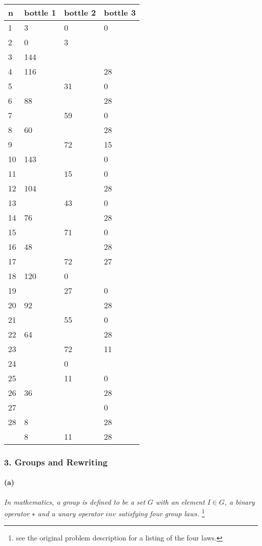 \documentclass[12pt]{article}
\begin{document}
\begin{tabular}{|l|l|l|l|}
    \hline  
    n & bottle 1    & bottle 2  & bottle 3  \\  
    \hline \hline
    1 & 3   & 0     & 0 \\  
    2 & 0   & 3     &   \\  
    3 & 144 &       &    \\  
    4 & 116 &       & 28 \\  
    5 &     & 31    & 0 \\  
    6 & 88  &       & 28 \\  
    7 &     & 59    & 0 \\  
    8 & 60  &       & 28 \\  
    9 &     & 72    & 15 \\  
    10& 143 &       & 0 \\  
    11&     & 15    & 0 \\  
    12& 104 &       & 28 \\  
    13&     & 43    & 0 \\  
    14& 76  &       & 28 \\  
    15&     & 71    & 0 \\  
    16& 48  &       & 28 \\
    17&     & 72    & 27 \\  
    18& 120 & 0     &  \\  
    19&     & 27    & 0 \\  
    20& 92  &       & 28 \\  
    21&     & 55    & 0 \\  
    22& 64  &       & 28 \\  
    23&     & 72    & 11 \\  
    24&     & 0     &   \\  
    25&     & 11    & 0 \\  
    26& 36  &       & 28 \\  
    27&     &       & 0 \\  
    28& 8   &       & 28 \\  
    \hline
      & 8   & 11    & 28 \\  
    \hline
\end{tabular}

\subsubsection*{3. Groups and Rewriting}
\paragraph{(a)} 
\textit{In mathematics, a group is defined to be a set $G$ with an 
element $I \in G$, a binary operator $∗$ and a unary operator $inv$ satisfying 
four group laws.} \footnote{see the original problem description for a listing
of the four laws.}
\end{document}
